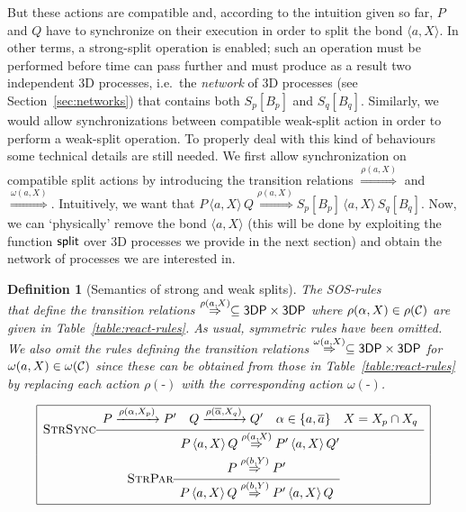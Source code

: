 \documentclass[11pt]{article}
\newcommand{\Split}{{\sf split}}
\newcommand{\proc}{\sf{3DP}}
\newcommand{\ch}[2]{\ensuremath{\langle #1, #2 \rangle}}
\newcommand{\channels}{{\cal C}}
\newcommand{\unionc}[1]{\,\langle #1 \rangle\,}
\def\sos#1#2{{\def\arraystretch{1.6}\begin{array}{c}#1\\\hline
#2\end{array}}}
\newcommand{\nar}[1]{\xrightarrow{#1}}
\newcommand{\dnar}[1]{\stackrel{#1}{\Rightarrow}}
\def\name#1{\mbox{\sc #1}}
\newtheorem{definition}{Definition}
\begin{document}
But these actions are compatible and, according to the intuition given so far, $P$ and $Q$ have to synchronize on their execution in order to split the bond $\ch{a}{X}$. In other terms, a strong-split operation is enabled; such an operation must be performed before time can pass further and must produce as a result two independent 3D processes, i.e.\ the {\em network} of 3D processes (see Section~\ref{sec:networks}) that contains both $S_p[B_p]$ and $S_q[B_q]$. Similarly, we would allow synchronizations between compatible weak-split action in order to perform a weak-split operation. To properly deal with this kind of behaviours some technical details are still needed. We first allow synchronization on compatible split actions by introducing the transition relations  $\dnar{\rho(a, X)}$ and $\dnar{\omega(a,X)}$. Intuitively, we want that  $P \unionc{a, X} Q \dnar{\rho(a, X)} S_p[B_p] \unionc{a, X} S_q [B_q]$. Now, we can `physically' remove the bond $\langle a,X \rangle$ (this will be done by exploiting the function $\Split$ over 3D processes we provide in the next section) and obtain the network of processes we are interested in.

\begin{definition}[Semantics of strong and weak splits] \label{def:splittings}
The SOS-rules \\ \noindent that define the transition relations $\dnar{\rho(a, X)} \subseteq \proc
\times \proc$ where $\rho(\alpha,X) \in \rho(\channels)$ are given in Table~\ref{table:react-rules}.
As usual, symmetric rules have been omitted. We also omit the rules defining the transition
relations $\dnar{\omega(a,X)} \subseteq \proc \times \proc$ for $\omega(a, X) \in
\omega(\channels)$ since these  can be obtained from those in Table~\ref{table:react-rules}
by replacing each action $\rho(\mbox{-})$ with the corresponding action $\omega(\mbox{-})$.
\end{definition}


\begin{table}[bh]
$$
\begin{array}{|c|}
\hline
\name{StrSync} \sos{P \nar{\rho(\alpha, X_p) } P' \quad
Q \nar{\rho(\overline{\alpha}, X_q) } Q' \quad
\alpha \in \{a, \overline{a}\} \quad
X = X_p \cap X_q
}
{P \unionc{a, X} Q \dnar{\rho(a, X)} P' \unionc{a, X} Q'}\\
\name{StrPar} \sos{P \dnar{\rho(b, Y)} P'}
{P \unionc{a, X} Q \dnar{\rho(b, Y)} P' \unionc{a, X} Q} \\
\hline
\end{array}
$$
\caption{Transitional semantics for strong-split actions}
\label{table:react-rules}
\end{table}
\end{document}
